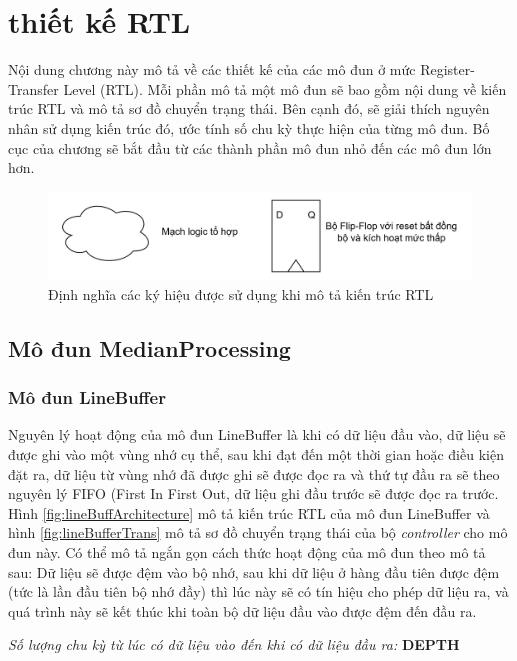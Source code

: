 \clearpage
{}

\setcounter{chapter}{2}
\chapter[{Thiết kế RTL}]{thiết kế RTL}
Nội dung chương này mô tả về các thiết kế của các mô đun ở mức Register-Transfer Level (RTL). Mỗi phần mô tả một mô đun sẽ bao gồm nội dung về kiến trúc RTL và mô tả sơ đồ chuyển trạng thái. Bên cạnh đó, sẽ giải thích nguyên nhân sử dụng kiến trúc đó, ước tính số chu kỳ thực hiện của từng mô đun. Bố cục của chương sẽ bắt đầu từ các thành phần mô đun nhỏ đến các mô đun lớn hơn.

\begin{figure}[!ht]
    \centering
    \includegraphics[width=1\linewidth]{figures/commonSymbol.png}
    \caption{Định nghĩa các ký hiệu được sử dụng khi mô tả kiến trúc RTL}
    \label{fig:commonSymbol}
\end{figure}
\section{Mô đun MedianProcessing}
\subsection{Mô đun LineBuffer}
Nguyên lý hoạt động của mô đun LineBuffer là khi có dữ liệu đầu vào, dữ liệu sẽ được ghi vào một vùng nhớ cụ thể, sau khi đạt đến một thời gian hoặc điều kiện đặt ra, dữ liệu từ vùng nhớ đã được ghi sẽ được đọc ra và thứ tự đầu ra sẽ theo nguyên lý FIFO (First In First Out, dữ liệu ghi đầu trước sẽ được đọc ra trước. Hình \ref{fig:lineBuffArchitecture} mô tả kiến trúc RTL của mô đun LineBuffer và hình \ref{fig:lineBufferTrans} mô tả sơ đồ chuyển trạng thái của bộ \textit{controller} cho mô đun này. Có thể mô tả ngắn gọn cách thức hoạt động của mô đun theo mô tả sau: Dữ liệu sẽ được đệm vào bộ nhớ, sau khi dữ liệu ở hàng đầu tiên được đệm (tức là lần đầu tiên bộ nhớ đầy) thì lúc này sẽ có tín hiệu cho phép dữ liệu ra, và quá trình này sẽ kết thúc khi toàn bộ dữ liệu đầu vào được đệm đến đầu ra. 


\textit{Số lượng chu kỳ từ lúc có dữ liệu vào đến khi có dữ liệu đầu ra: } \textbf{DEPTH}


